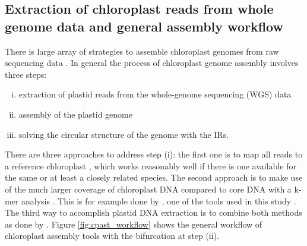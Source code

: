 \subsection{Extraction of chloroplast reads from whole genome data and general assembly workflow}
There is large array of strategies to assemble chloroplast genomes from raw sequencing
data \cite{twyford_strategies_2017}. In general the process of chloroplast genome assembly
involves three steps:
\begin{enumerate}[(i)]
\item extraction of plastid reads from the whole-genome sequencing (WGS) data
\item assembly of the plastid genome
\item solving the circular structure of
the genome with the IRs.
\end{enumerate}
There are three approaches to address step (i): the first one is to map all reads to a
reference chloroplast \cite{Vinga2012}, which works reasonably well if there is one
available for the same or at least a closely related species. The second approach is to
make use of the much larger coverage of chloroplast DNA compared to core DNA with a k-mer
analysis \cite{Chan2013}. This is for example done by \ce \hspace{0.25ex}, one of the tools used in this study
\cite{j_ankenbrand_chloroextractor:_2018}. The third way to accomplish plastid DNA
extraction is to combine both methods as done by \np \hspace{0.25ex}
\cite{dierckxsens_novoplasty:_2017}. Figure \ref{fig:cpast_workflow} shows the general
workflow of chloroplast assembly tools with the bifurcation at step (ii).

